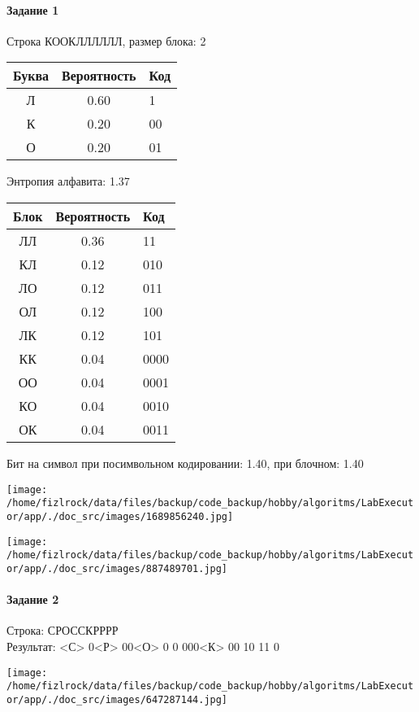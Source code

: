 \documentclass[a4paper, 12pt]{article}
\begin{document}
\paragraph{Задание 1}

Строка КООКЛЛЛЛЛЛ, размер блока: 2
\begin{center}
 \begin{tabular}{ |c|c|l| } 
  \hline
     Буква & Вероятность & Код\\ \hline
Л & 0.60 & 1\\\hline
К & 0.20 & 00\\\hline
О & 0.20 & 01
\\ \hline \end{tabular}
\end{center}
Энтропия алфавита: 1.37
\begin{center}
 \begin{tabular}{ |c|c|l| } 
  \hline
     Блок & Вероятность & Код\\ \hline
ЛЛ & 0.36 & 11\\\hline
КЛ & 0.12 & 010\\\hline
ЛО & 0.12 & 011\\\hline
ОЛ & 0.12 & 100\\\hline
ЛК & 0.12 & 101\\\hline
КК & 0.04 & 0000\\\hline
ОО & 0.04 & 0001\\\hline
КО & 0.04 & 0010\\\hline
ОК & 0.04 & 0011
\\ \hline \end{tabular}
\end{center}
Бит на символ при посимвольном кодировании: 1.40, при блочном: 1.40

\texttt{[image: /home/fizlrock/data/files/backup/code\_backup/hobby/algoritms/LabExecutor/app/./doc\_src/images/1689856240.jpg]}

\texttt{[image: /home/fizlrock/data/files/backup/code\_backup/hobby/algoritms/LabExecutor/app/./doc\_src/images/887489701.jpg]}
\pagebreak
\paragraph{Задание 2}

Строка: 
СРОССКРРРР\\
Результат: <С> 0<Р> 00<О> 0 0 000<К> 00 10 11 0

\texttt{[image: /home/fizlrock/data/files/backup/code\_backup/hobby/algoritms/LabExecutor/app/./doc\_src/images/647287144.jpg]}
\end{document}
